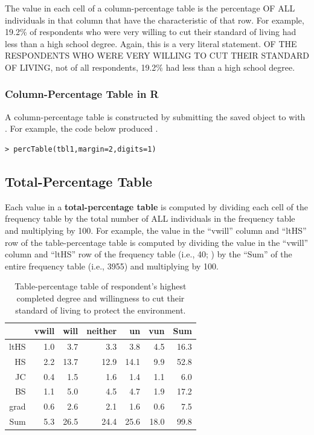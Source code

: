 \documentclass[10pt,openany]{book}\usepackage[]{graphicx}\usepackage[]{color}
\makeatletter
\newenvironment{kframe}{%
 \def\at@end@of@kframe{}%
 \ifinner\ifhmode%
  \def\at@end@of@kframe{\end{minipage}}%
  \begin{minipage}{\columnwidth}%
 \fi\fi%
 \def\FrameCommand##1{\hskip\@totalleftmargin \hskip-\fboxsep
 \colorbox{shadecolor}{##1}\hskip-\fboxsep
     \hskip-\linewidth \hskip-\@totalleftmargin \hskip\columnwidth}%
 \MakeFramed {\advance\hsize-\width
   \@totalleftmargin\z@ \linewidth\hsize
   \@setminipage}}%
 {\par\unskip\endMakeFramed%
 \at@end@of@kframe}
\newenvironment{knitrout}{}{} %
\makeatother
\begin{document}
The value in each cell of a column-percentage table is the percentage OF ALL individuals in that column that have the characteristic of that row. For example, 19.2\% of respondents who were very willing to cut their standard of living had less than a high school degree. Again, this is a very literal statement. OF THE RESPONDENTS WHO WERE VERY WILLING TO CUT THEIR STANDARD OF LIVING, not of all respondents, 19.2\% had less than a high school degree.

\subsubsection*{Column-Percentage Table in R}
A column-percentage table is constructed by submitting the saved  object to  with . For example, the code below produced .
\begin{knitrout}
\color{fgcolor}\begin{kframe}
\begin{verbatim}
> percTable(tbl1,margin=2,digits=1)
\end{verbatim}
\end{kframe}
\end{knitrout}

\subsection{Total-Percentage Table}
Each value in a \textbf{total-percentage table} is computed by dividing each cell of the frequency table by the total number of ALL individuals in the frequency table and multiplying by 100. For example, the value in the ``vwill'' column and ``ltHS'' row of the table-percentage table  is computed by dividing the value in the ``vwill'' column and ``ltHS'' row of the frequency table (i.e., 40; ) by the ``Sum'' of the entire frequency table (i.e., 3955) and multiplying by 100.

\begin{table}[ht]
\centering
\caption{Table-percentage table of respondent's highest completed degree and willingness to cut their standard of living to protect the environment.} 
\label{tab:EnvTblP}
\begin{tabular}{rrrrrrr}
  \hline
 & vwill & will & neither & un & vun & Sum \\ 
  \hline
ltHS & 1.0 & 3.7 & 3.3 & 3.8 & 4.5 & 16.3 \\ 
  HS & 2.2 & 13.7 & 12.9 & 14.1 & 9.9 & 52.8 \\ 
  JC & 0.4 & 1.5 & 1.6 & 1.4 & 1.1 & 6.0 \\ 
  BS & 1.1 & 5.0 & 4.5 & 4.7 & 1.9 & 17.2 \\ 
  grad & 0.6 & 2.6 & 2.1 & 1.6 & 0.6 & 7.5 \\ 
  Sum & 5.3 & 26.5 & 24.4 & 25.6 & 18.0 & 99.8 \\ 
   \hline
\end{tabular}
\end{table}
\end{document}
